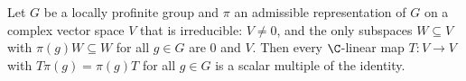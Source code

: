 Let $G$ be a locally profinite group and $\pi$ an admissible representation of $G$ on a complex vector space $V$ that
is irreducible: $V\neq0$, and the only subspaces $W\subseteq V$ with $\pi(g)W\subseteq W$ for all $g\in G$ are $0$ and
$V$. Then every $\C$-linear map $T\colon V\to V$ with $T\pi(g)=\pi(g)T$ for all $g\in G$ is a scalar multiple of the
identity.
